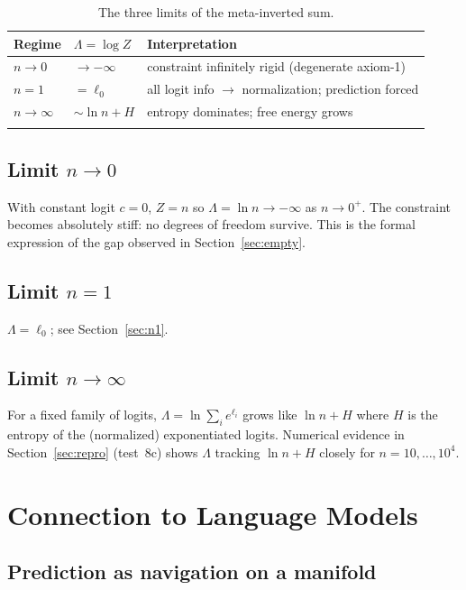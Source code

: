 \documentclass[11pt]{article}
\begin{document}
\begin{longtable}{@{}lll@{}}
\toprule
Regime & $\Lambda = \log Z$ & Interpretation \\
\midrule
$n\to 0$ & $\to -\infty$ & constraint infinitely rigid (degenerate axiom-1) \\
$n = 1$ & $= \ell_0$ & all logit info $\to$ normalization; prediction forced \\
$n\to\infty$ & $\sim \ln n + H$ & entropy dominates; free energy grows \\
\bottomrule
\caption{The three limits of the meta-inverted sum.}
\label{tab:limits}
\end{longtable}

\subsection{Limit $n\to 0$}
\label{sec:limit-0}

With constant logit $c=0$, $Z=n$ so $\Lambda = \ln n \to -\infty$ as
$n\to 0^+$. The constraint becomes absolutely stiff: no degrees of freedom
survive. This is the formal expression of the gap observed in
Section~\ref{sec:empty}.

\subsection{Limit $n=1$}
\label{sec:limit-1}

$\Lambda = \ell_0$; see Section~\ref{sec:n1}.

\subsection{Limit $n\to\infty$}
\label{sec:limit-inf}

For a fixed family of logits, $\Lambda = \ln\sum_i e^{\ell_i}$ grows like
$\ln n + H$ where $H$ is the entropy of the (normalized) exponentiated
logits. Numerical evidence in Section~\ref{sec:repro} (test~8c) shows $\Lambda$
tracking $\ln n + H$ closely for $n=10,\dots,10^4$.

\section{Connection to Language Models}
\label{sec:llm}

\subsection{Prediction as navigation on a manifold}
\label{sec:llm-nav}
\end{document}
